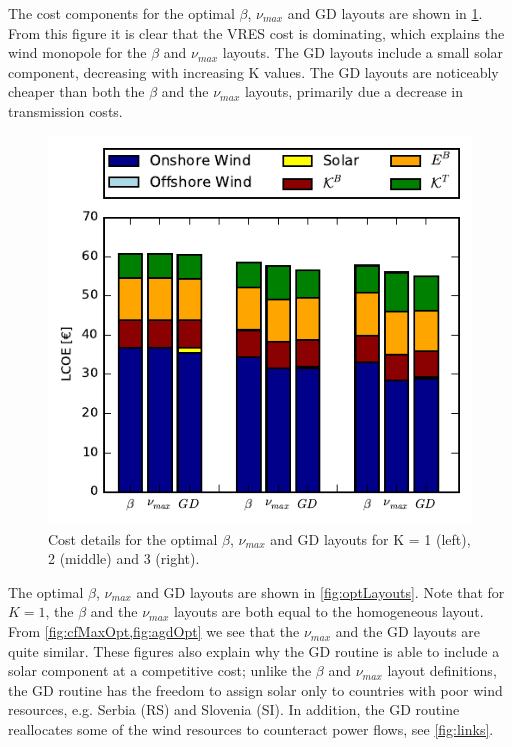 \documentclass[a4paper, 5p, sort&compress]{elsarticle}%
\begin{document}
The cost components for the optimal $\beta$, $\nu_{max}$ and GD layouts are
shown in \cref{fig:cost}. From this figure it is clear that the VRES
cost is dominating, which explains the wind monopole for the $\beta$ and
$\nu_{max}$ layouts. The GD layouts include a small solar component,
decreasing with increasing K values. The GD layouts are noticeably
cheaper than both the $\beta$ and the $\nu_{max}$ layouts, primarily due a
decrease in transmission costs.

\begin{figure}[h!]
  \centering
  \includegraphics[width = \columnwidth]{costVE50}
  \caption{Cost details for the optimal $\beta$, $\nu_{max}$ and GD layouts
    for K = 1 (left), 2 (middle) and 3 (right).}
  \label{fig:cost}
\end{figure}

The optimal $\beta$, $\nu_{max}$ and GD layouts are shown in
\cref{fig:optLayouts}. Note that for $K=1$, the $\beta$ and the
$\nu_{max}$ layouts are both equal to the homogeneous layout. From
\cref{fig:cfMaxOpt,fig:agdOpt} we see that the $\nu_{max}$ and the GD
layouts are quite similar. These figures also explain why the GD
routine is able to include a solar component at a competitive cost;
unlike the $\beta$ and $\nu_{max}$ layout definitions, the GD routine has
the freedom to assign solar only to countries with poor wind
resources, e.g. Serbia (RS) and Slovenia (SI). In addition, the GD
routine reallocates some of the wind resources%
to counteract power flows, see \cref{fig:links}.
\end{document}

